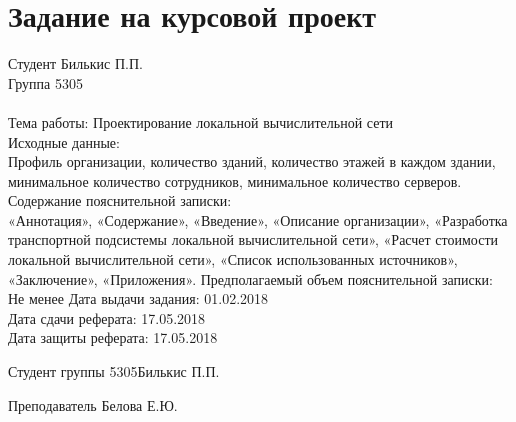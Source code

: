 \documentclass[a4paper,14pt,russian]{article}
\newcommand{\theme}{Проектирование локальной вычислительной сети}
\newcommand{\groupnumber}{5305}
\newcommand{\studentname}{Билькис П.П.}
\newcommand{\teachername}{Белова Е.Ю.}
\begin{document}


\section*{Задание на курсовой проект}

Студент \studentname\\
Группа \groupnumber\\\\
Тема работы: \theme\\
Исходные данные:\\
Профиль организации, количество зданий, количество этажей в каждом здании, минимальное количество сотрудников, минимальное количество серверов.
Содержание пояснительной записки:\\
«Аннотация», «Содержание», «Введение», «Описание организации», «Разработка транспортной подсистемы локальной вычислительной сети», «Расчет стоимости локальной вычислительной сети», «Список использованных источников», «Заключение», «Приложения».
Предполагаемый объем пояснительной записки:\\
Не менее \pageref{LastPage}
Дата выдачи задания: 01.02.2018\\
Дата сдачи реферата: 17.05.2018\\
Дата защиты реферата: 17.05.2018\\

\vfill


Студент группы \groupnumber \hfill \studentname


Преподаватель \hfill \teachername


\clearpage

\begin{abstract}
  В курсовом проекте необходимо выполнить проектирование локальной вычислительной сети производства одежды. В первой части проекта приведено описание функций и структуры производства, направлений работы его подразделений. Вторая часть проекта включает в себя разработку транспортной подсистемы локальной вычислительной сети производства одежды. В третьей части проекта выполнена оценка стоимости локальной вычислительной сети и её дальнейшая эксплуатация, выдвинуты требования к составу обслуживающего персонала.
\end{abstract}


\begin{abstract}
  In this coursework local computer network for the clothes manufacture is described. The first section presented basic stucture \& functions of the manufacture, it's subdivisions and their responsibilities are depicted. The second, however, describes transport sub-system of the local computer network. The third section contains of cost estimations for bulding and supporting this local computer network, and staff requirements.
\end{abstract}
\end{document}
